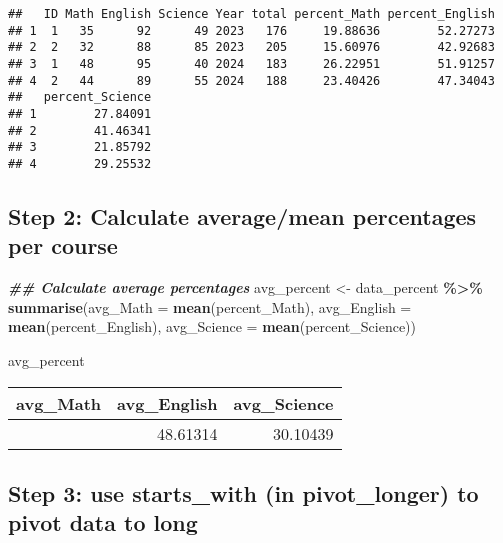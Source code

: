 \documentclass[
]{article}
\newenvironment{Shaded}{\begin{snugshade}}{\end{snugshade}}
\newcommand{\AttributeTok}[1]{\textcolor[rgb]{0.13,0.29,0.53}{#1}}
\newcommand{\DocumentationTok}[1]{\textcolor[rgb]{0.56,0.35,0.01}{\textbf{\textit{#1}}}}
\newcommand{\FunctionTok}[1]{\textcolor[rgb]{0.13,0.29,0.53}{\textbf{#1}}}
\newcommand{\NormalTok}[1]{#1}
\newcommand{\OtherTok}[1]{\textcolor[rgb]{0.56,0.35,0.01}{#1}}
\newcommand{\SpecialCharTok}[1]{\textcolor[rgb]{0.81,0.36,0.00}{\textbf{#1}}}
\begin{document}
\begin{verbatim}
##   ID Math English Science Year total percent_Math percent_English
## 1  1   35      92      49 2023   176     19.88636        52.27273
## 2  2   32      88      85 2023   205     15.60976        42.92683
## 3  1   48      95      40 2024   183     26.22951        51.91257
## 4  2   44      89      55 2024   188     23.40426        47.34043
##   percent_Science
## 1        27.84091
## 2        41.46341
## 3        21.85792
## 4        29.25532
\end{verbatim}

\hypertarget{step-2-calculate-averagemean-percentages-per-course}{%
\subsection{Step 2: Calculate average/mean percentages per
course}\label{step-2-calculate-averagemean-percentages-per-course}}

\begin{Shaded}
\begin{Highlighting}[]
\DocumentationTok{\#\# Calculate average percentages}
\NormalTok{avg\_percent }\OtherTok{\textless{}{-}}\NormalTok{ data\_percent }\SpecialCharTok{\%\textgreater{}\%}
  \FunctionTok{summarise}\NormalTok{(}\AttributeTok{avg\_Math =} \FunctionTok{mean}\NormalTok{(percent\_Math),}
            \AttributeTok{avg\_English =} \FunctionTok{mean}\NormalTok{(percent\_English),}
            \AttributeTok{avg\_Science =} \FunctionTok{mean}\NormalTok{(percent\_Science))}

\NormalTok{avg\_percent}
\end{Highlighting}
\end{Shaded}

\begin{longtable}[]{@{}rrr@{}}
\toprule\noalign{}
avg\_Math & avg\_English & avg\_Science \\
\midrule\noalign{}
\endhead
\bottomrule\noalign{}
\endlastfoot
21.28247 & 48.61314 & 30.10439 \\
\end{longtable}

\hypertarget{step-3-use-starts_with-in-pivot_longer-to-pivot-data-to-long}{%
\subsection{Step 3: use starts\_with (in pivot\_longer) to pivot data to
long}\label{step-3-use-starts_with-in-pivot_longer-to-pivot-data-to-long}}
\end{document}
